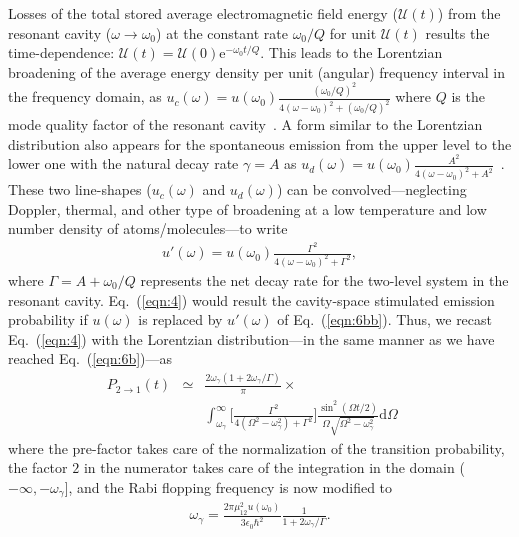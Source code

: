 \documentclass[aps,pra,twocolumn,showpacs,preprintnumbers,amsmath,amssymb,footinbib]{revtex4}
\begin{document}
Losses of the total stored average electromagnetic field energy ($\mathcal{U}(t)$) from the resonant cavity ($\omega\rightarrow\omega_0$) at the constant rate $\omega_0/Q$ {for unit $\mathcal{U}(t)$} results the time-dependence: $\mathcal{U}(t)=\mathcal{U}(0)\text{e}^{-\omega_0t/Q}$. This leads to the Lorentzian broadening of the average energy density per unit (angular) frequency interval in the frequency domain, as $u_c(\omega)=u(\omega_0)\frac{(\omega_0/Q)^2}{4(\omega-\omega_0)^2+(\omega_0/Q)^2}$ where $Q$ is the mode quality factor of the resonant cavity~\cite{Qfactor}. A form similar to the Lorentzian distribution also appears for the spontaneous emission from the upper level to the lower one with the natural decay rate $\gamma=A$ as $u_d(\omega)=u(\omega_0)\frac{A^2}{4(\omega-\omega_0)^2+A^2}$~\cite{Weisskopf}. {These two line-shapes ($u_c(\omega)$ and $u_d(\omega)$) can be convolved}---neglecting Doppler, thermal, and other type of broadening at a low temperature and low number density of atoms/molecules---to write~{\cite{Line-Broadening}}
\begin{eqnarray}\label{eqn:6bb}
u'(\omega)=u(\omega_0)\frac{\Gamma^2}{4(\omega-\omega_0)^2+\Gamma^2},
\end{eqnarray}
where $\Gamma=A+\omega_0/Q$ represents the net decay rate {for the two-level system in the resonant cavity}. Eq.~(\ref{eqn:4}) would result the cavity-space stimulated emission probability if $u(\omega)$ is replaced by $u'(\omega)$ of Eq.~(\ref{eqn:6bb}). Thus, we recast Eq.~(\ref{eqn:4}) with the Lorentzian distribution---in the same manner as we have reached Eq.~(\ref{eqn:6b})---as
\begin{eqnarray}\label{eqn:6c}
P_{2\rightarrow1}(t)&\simeq&\frac{2\omega_\gamma(1+2\omega_\gamma/ \Gamma)}{\pi}\nonumber\times\\&&\int_{\omega_\gamma}^\infty\bigg[\frac{\Gamma^2}{4(\Omega^2-\omega_\gamma^2)+\Gamma^2}\bigg]\frac{\sin^2(\Omega t/2)}{\Omega\sqrt{\Omega^2-\omega_\gamma^2}}\text{d}\Omega~~~~~
\end{eqnarray}
where the pre-factor takes care of the normalization of the transition probability, the factor $2$ in the numerator takes care of the integration in the domain ($-\infty,-\omega_\gamma$], and the Rabi flopping frequency is now modified to
\begin{eqnarray}\label{eqn:6d}
\omega_\gamma=\frac{2\pi\mu_{12}^2u(\omega_0)}{3\epsilon_0\hbar^2}\frac{1}{1+2\omega_\gamma/\Gamma}.
\end{eqnarray}
\end{document}
